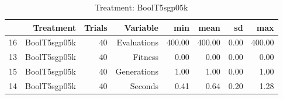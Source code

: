 \begin{table}[ht]
\centering
\begin{tabular}{rrrrrrrr}
  \hline
 & Treatment & Trials & Variable & min & mean & sd & max \\ 
  \hline
16 & BoolT5sgp05k &  40 & Evaluations & 400.00 & 400.00 & 0.00 & 400.00 \\ 
  13 & BoolT5sgp05k &  40 & Fitness & 0.00 & 0.00 & 0.00 & 0.00 \\ 
  15 & BoolT5sgp05k &  40 & Generations & 1.00 & 1.00 & 0.00 & 1.00 \\ 
  14 & BoolT5sgp05k &  40 & Seconds & 0.41 & 0.64 & 0.20 & 1.28 \\ 
   \hline
\end{tabular}
\caption{Treatment: BoolT5sgp05k} 
\end{table}
